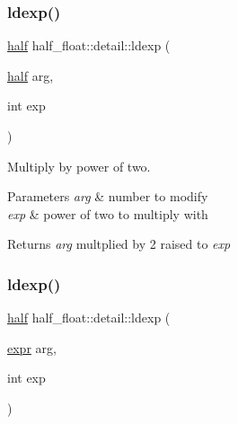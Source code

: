 \mbox{\label{namespacehalf__float_1_1detail_a4540a29921074f33bc8be71904e12aef}} 
\subsubsection{\texorpdfstring{ldexp()}{ldexp()}\hspace{0.1cm}{\footnotesize\ttfamily [1/2]}}
{\footnotesize\ttfamily \hyperlink{classhalf__float_1_1half}{half} half\+\_\+float\+::detail\+::ldexp (\begin{DoxyParamCaption}\item[{\hyperlink{classhalf__float_1_1half}{half}}]{arg,  }\item[{int}]{exp }\end{DoxyParamCaption})\hspace{0.3cm}{\ttfamily [inline]}}

Multiply by power of two. 
\begin{DoxyParams}{Parameters}
{\em arg} & number to modify \\
\hline
{\em exp} & power of two to multiply with \\
\hline
\end{DoxyParams}
\begin{DoxyReturn}{Returns}
{\itshape arg} multplied by 2 raised to {\itshape exp} 
\end{DoxyReturn}
\mbox{\label{namespacehalf__float_1_1detail_a78e551ce438f7098e0872fceb09c8c75}} 
\subsubsection{\texorpdfstring{ldexp()}{ldexp()}\hspace{0.1cm}{\footnotesize\ttfamily [2/2]}}
{\footnotesize\ttfamily \hyperlink{classhalf__float_1_1half}{half} half\+\_\+float\+::detail\+::ldexp (\begin{DoxyParamCaption}\item[{\hyperlink{structhalf__float_1_1detail_1_1expr}{expr}}]{arg,  }\item[{int}]{exp }\end{DoxyParamCaption})\hspace{0.3cm}{\ttfamily [inline]}}


